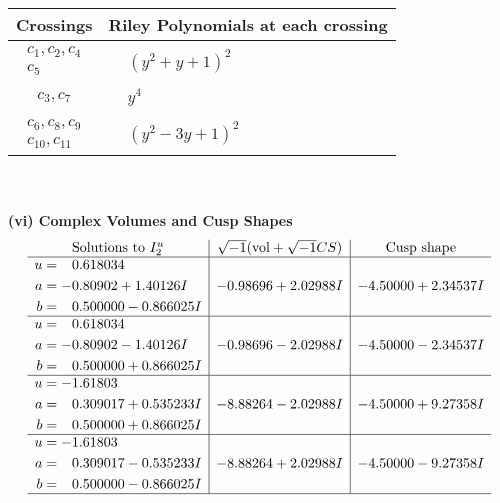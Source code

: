 \documentclass[1p]{elsarticle_modified}
\theoremstyle{definition}
\newcommand{\I}{\sqrt{-1}}
\begin{document}
\begin{tabular}{m{50pt}|m{274pt}}
Crossings & \hspace{64pt}Riley Polynomials at each crossing \\
\hline $$\begin{aligned}c_{1},c_{2},c_{4}\\c_{5}\end{aligned}$$&$\begin{aligned}
&(y^2+y+1)^2
\end{aligned}$\\
\hline $$\begin{aligned}c_{3},c_{7}\end{aligned}$$&$\begin{aligned}
&y^4
\end{aligned}$\\
\hline $$\begin{aligned}c_{6},c_{8},c_{9}\\c_{10},c_{11}\end{aligned}$$&$\begin{aligned}
&(y^2-3 y+1)^2
\end{aligned}$\\
\hline
\end{tabular}\\~\\
\newpage\flushleft \textbf{(vi) Complex Volumes and Cusp Shapes}
$$\begin{array}{c|c|c}  
\text{Solutions to }I^u_{2}& \I (\text{vol} + \sqrt{-1}CS) & \text{Cusp shape}\\
 \hline 
\begin{aligned}
u &= \phantom{-}0.618034\phantom{ +0.000000I} \\
a &= -0.80902 + 1.40126 I \\
b &= \phantom{-}0.500000 - 0.866025 I\end{aligned}
 & -0.98696 + 2.02988 I & -4.50000 + 2.34537 I \\ \hline\begin{aligned}
u &= \phantom{-}0.618034\phantom{ +0.000000I} \\
a &= -0.80902 - 1.40126 I \\
b &= \phantom{-}0.500000 + 0.866025 I\end{aligned}
 & -0.98696 - 2.02988 I & -4.50000 - 2.34537 I \\ \hline\begin{aligned}
u &= -1.61803\phantom{ +0.000000I} \\
a &= \phantom{-}0.309017 + 0.535233 I \\
b &= \phantom{-}0.500000 + 0.866025 I\end{aligned}
 & -8.88264 - 2.02988 I & -4.50000 + 9.27358 I \\ \hline\begin{aligned}
u &= -1.61803\phantom{ +0.000000I} \\
a &= \phantom{-}0.309017 - 0.535233 I \\
b &= \phantom{-}0.500000 - 0.866025 I\end{aligned}
 & -8.88264 + 2.02988 I & -4.50000 - 9.27358 I\\
 \hline 
 \end{array}$$\newpage
\end{document}
